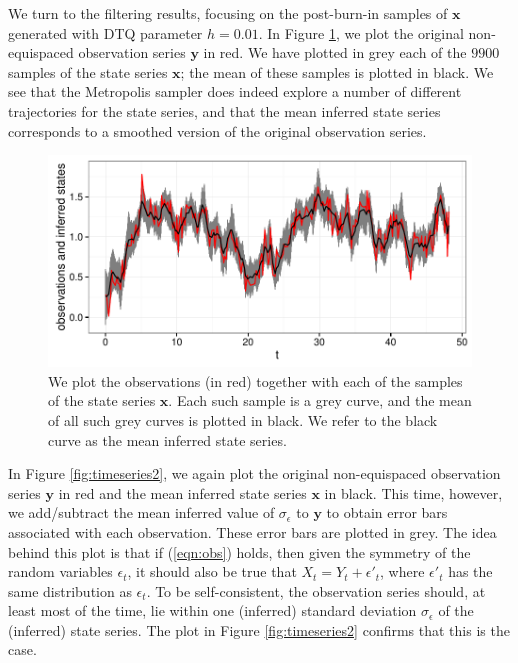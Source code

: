 \documentclass[wcp]{jmlr}
\begin{document}
We turn to the filtering results, focusing on the post-burn-in samples of
$\mathbf{x}$ generated with DTQ parameter $h=0.01$.  In Figure
\ref{fig:timeseries1}, we plot the original non-equispaced observation
series $\mathbf{y}$ in red.  We have plotted in grey each of the
$9900$ samples of the state series $\mathbf{x}$; the mean of these
samples is plotted in black.  We see that the Metropolis sampler does
indeed explore a number of different trajectories for the state
series, and that the mean inferred state series corresponds to a
smoothed version of the original observation series.


\begin{figure}[th]
\begin{center}
\includegraphics[width=6in]{timeseries1}
\end{center}
\caption{We plot the observations (in red) together with each of the
  samples of the state series $\mathbf{x}$.  Each such sample is a
  grey curve, and the mean of all such grey curves is plotted in
  black.  We refer to the black curve as the mean inferred state series.}
\label{fig:timeseries1}
\end{figure}


In Figure \ref{fig:timeseries2}, we again plot the original
non-equispaced observation series $\mathbf{y}$ in red and the mean
inferred state series $\mathbf{x}$ in black.  This time,
however, we add/subtract the mean inferred value of $\sigma_\epsilon$
to $\mathbf{y}$ to obtain error bars associated with each
observation.  These error bars are plotted in grey.  The idea behind
this plot is that if (\ref{eqn:obs}) holds, then given the symmetry of
the random variables $\epsilon_t$, it should also be true that $X_t =
Y_t + \epsilon'_t$, where $\epsilon'_t$ has the same distribution as
$\epsilon_t$.  To be self-consistent, the observation series should,
at least most of the time, lie within one (inferred) standard deviation
$\sigma_\epsilon$ of the (inferred) state series.  The plot in Figure
\ref{fig:timeseries2} confirms that this is the case.
\end{document}
